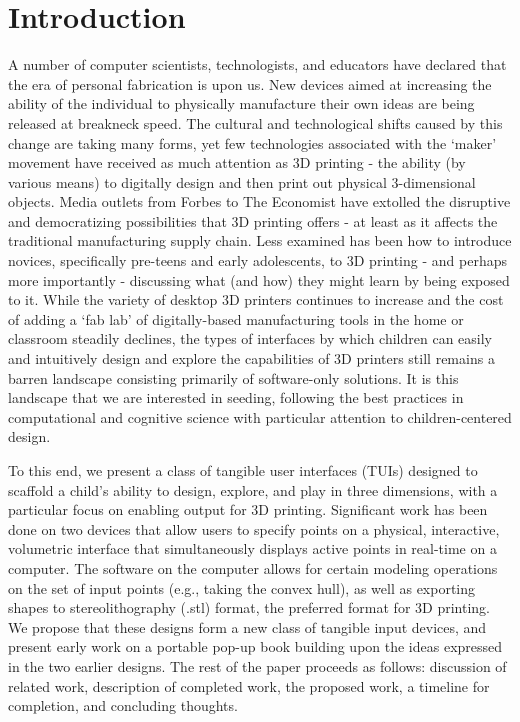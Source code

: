 \chapter{Introduction}
\label{intro}

A number of computer scientists, technologists, and educators have declared that
the era of personal fabrication is upon
us\cite{anderson2012makers}\cite{Gershenfeld:2007:FCR:1211574}. New devices
aimed at increasing the ability of the individual to physically manufacture
their own ideas are being released at breakneck speed. The cultural and
technological shifts caused by this change are taking many forms, yet few
technologies associated with the `maker' movement have received as much
attention as 3D printing - the ability (by various means) to digitally design
and then print out physical 3-dimensional objects. Media outlets from
Forbes\cite{forbes} to The Economist\cite{economist} have extolled the
disruptive and democratizing possibilities that 3D printing offers - at least as
it affects the traditional manufacturing supply chain. Less examined has been
how to introduce novices, specifically pre-teens and early adolescents, to 3D
printing - and perhaps more importantly - discussing what (and how) they might
learn by being exposed to it.
While the variety of desktop 3D printers continues to increase and the cost of
adding a `fab lab' of digitally-based manufacturing tools in the home or
classroom steadily declines, the types of interfaces by which children can
easily and intuitively design and explore the capabilities of 3D printers still
remains a barren landscape consisting primarily of software-only solutions. It
is this landscape that we are interested in seeding, following the best
practices in computational and cognitive science with particular attention to
children-centered design.

To this end, we present a class of tangible user interfaces (TUIs) designed to
scaffold a child's ability to design, explore, and play in three dimensions,
with a particular focus on enabling output for 3D printing.
Significant work has been done on two devices that allow users to specify points
on a physical, interactive, volumetric interface that simultaneously displays
active points in real-time on a computer. The software on the computer allows
for certain modeling operations on the set of input points (e.g., taking the
convex hull), as well as exporting shapes to stereolithography (.stl) format,
the preferred format for 3D printing. We propose that these designs form a new
class of tangible input devices, and present early work on a portable pop-up
book building upon the ideas expressed in the two earlier designs. The rest of
the paper proceeds as follows: discussion of related work, description of
completed work, the proposed work, a timeline for completion, and concluding
thoughts.
